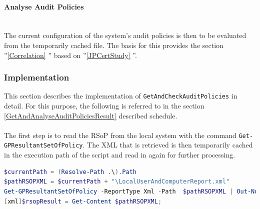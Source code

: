 \paragraph{Analyse Audit Policies} \ \\
The current configuration of the system's audit policies is then to be evaluated from the temporarily cached file. The basis for this provides the section ''\ref{Correlation} '' based on ''\ref{JPCertStudy} ''.

\clearpage 

\subsubsection{Implementation}
This section describes the implementation of \lstinline|GetAndCheckAuditPolicies| in detail. For this purpose, the following is referred to in the section \ref{GetAndAnalyseAuditPoliciesResult}  described schedule.
\\\\
The first step is to read the RSoP from the local system with the command \lstinline|Get-GPResultantSetOfPolicy|. The XML that is retrieved is then temporarily cached in the execution path of the script and read in again for further processing.
\begin{lstlisting}[caption=Get-GPResultantSetOfPolicy, language=PowerShell]
$currentPath = (Resolve-Path .\).Path
$pathRSOPXML = $currentPath + "\LocalUserAndComputerReport.xml"
Get-GPResultantSetOfPolicy -ReportType Xml -Path  $pathRSOPXML | Out-Null;
[xml]$rsopResult = Get-Content $pathRSOPXML;
\end{lstlisting}
\vspace{1cm}
